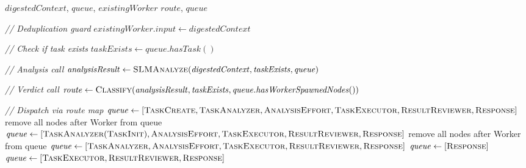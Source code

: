 \documentclass{article}
\begin{document}
\begin{algorithm}[t]
\caption{TINYCUA Worker Node}
\label{alg:worker}
\begin{algorithmic}[1]
\Require $\mathit{digestedContext}$, $\mathit{queue}$, $\mathit{existingWorker}$
\Ensure $\mathit{route}$, $\mathit{queue}$

\Statex \textit{// Deduplication guard}
    \State $\mathit{existingWorker.input} \gets \mathit{digestedContext}$
    \State \Return
\EndIf

\Statex \textit{// Check if task exists}
\State $\mathit{taskExists} \gets \mathit{queue.hasTask()}$

\Statex \textit{// Analysis call}
\State $\mathit{analysisResult} \gets \textsc{SLMAnalyze}(\mathit{digestedContext}, \mathit{taskExists}, \mathit{queue})$

\Statex \textit{// Verdict call}
\State $\mathit{route} \gets \textsc{Classify}(\mathit{analysisResult}, \mathit{taskExists}, \mathit{queue.hasWorkerSpawnedNodes()})$

\Statex \textit{// Dispatch via route map}
    \State $\mathit{queue} \gets [\textsc{TaskCreate}, \textsc{TaskAnalyzer}, \textsc{AnalysisEffort}, \textsc{TaskExecutor}, \textsc{ResultReviewer}, \textsc{Response}]$
    \State remove all nodes after Worker from queue
    \State $\mathit{queue} \gets [\textsc{TaskAnalyzer}(\textsc{TaskInit}), \textsc{AnalysisEffort}, \textsc{TaskExecutor}, \textsc{ResultReviewer}, \textsc{Response}]$
    \State remove all nodes after Worker from queue
    \State $\mathit{queue} \gets [\textsc{TaskAnalyzer}, \textsc{AnalysisEffort}, \textsc{TaskExecutor}, \textsc{ResultReviewer}, \textsc{Response}]$
    \State $\mathit{queue} \gets [\textsc{Response}]$
    \State $\mathit{queue} \gets [\textsc{TaskExecutor}, \textsc{ResultReviewer}, \textsc{Response}]$
\EndIf

\end{algorithmic}
\end{algorithm}
\end{document}
